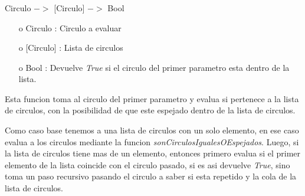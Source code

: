 \documentclass[10pt,journal]{IEEEtran}
\begin{document}
\subsubsection{\color{Red}{repetidoPrimeroEspejadosAux}}
\begin{description}[style=nextline]
        \item[\color{Green}{Signatura}] Circulo $->$ [Circulo] $->$ Bool
        \begin{itemize} 
        \item [o]   Circulo : Circulo a evaluar
        \item [o]  [Circulo] : Lista de circulos
        \item [o]  Bool : Devuelve \textit{True} si el circulo del primer parametro esta dentro de la lista.
        \end{itemize}        
        
        \item[\color{Green}{Descripción}]   Esta funcion toma al circulo del primer parametro y evalua si pertenece a la lista de circulos, con la posibilidad de que este espejado dentro de la lista de circulos. 
        
        Como caso base tenemos a una lista de circulos con un solo elemento, en ese caso evalua a los circulos mediante la funcion \textit{sonCirculosIgualesOEspejados}. Luego, si la lista de circulos tiene mas de un elemento, entonces primero evalua si el primer elemento de la lista coincide con el circulo pasado, si es asi devuelve \textit{True}, sino toma un paso recursivo pasando el circulo a saber si esta repetido y la cola de la lista de circulos.
\end{description}
\end{document}
